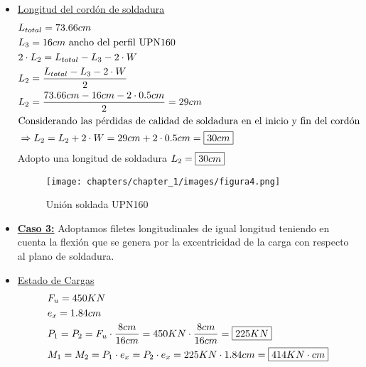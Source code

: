 \begin{enumerate}
\begin{itemize}
\item \underline{Longitud del cordón de soldadura}
\begin{align*}
& L_{total} = 73.66cm \\
& L_3 = 16cm \text{ ancho del perfil UPN160}\\
& 2 \cdot L_2 = L_{total}-L_3-2 \cdot W \\
& L_2 = \frac{L_{total}-L_3-2 \cdot W}{2} \\
& L_2 = \frac{73.66cm-16cm-2 \cdot 0.5cm}{2} = 29cm \\
& \text{Considerando las pérdidas de calidad de soldadura en el inicio y fin del cordón} \\
& \Rightarrow L_2 = L_2 + 2 \cdot W = 29cm + 2 \cdot 0.5cm = \framebox{$30cm$} \\
\end{align*}
Adopto una longitud de soldadura $L_2 = \framebox{$30 cm$}$\\
\begin{figure}[H]
\begin{center}
     \texttt{[image: chapters/chapter\_1/images/figura4.png]}
\end{center}
\caption{Unión soldada UPN160}
\end{figure}
\newpage
\item \underline{\textbf{Caso 3:}}
Adoptamos filetes longitudinales de igual longitud teniendo en cuenta la flexión que se genera por la excentricidad de la carga con respecto al plano de soldadura.\\

\item \underline{Estado de Cargas}
\begin{align*}
& F_u = 450 KN \\
& e_x = 1.84cm \\
& P_1 = P_2 = F_u \cdot \frac{8cm}{16cm} = 450KN \cdot \frac{8cm}{16cm} = \framebox{$225KN$}\\
& M_1 = M_2 = P_1 \cdot e_x = P_2 \cdot e_x = 225KN \cdot 1.84cm = \framebox{$414 KN \cdot cm$}
\end{align*}


\end{itemize}
\end{enumerate}
